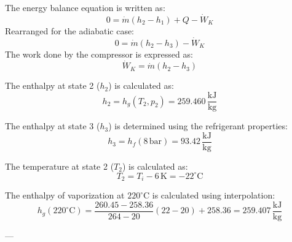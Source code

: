 The energy balance equation is written as:  
\[
0 = \dot{m}(h_2 - h_1) + Q - \dot{W}_K
\]  
Rearranged for the adiabatic case:  
\[
0 = \dot{m}(h_2 - h_3) - \dot{W}_K
\]  
The work done by the compressor is expressed as:  
\[
\dot{W}_K = \dot{m}(h_2 - h_3)
\]  

The enthalpy at state 2 (\(h_2\)) is calculated as:  
\[
h_2 = h_g(T_2, p_2) = 259.460 \, \frac{\text{kJ}}{\text{kg}}
\]  

The enthalpy at state 3 (\(h_3\)) is determined using the refrigerant properties:  
\[
h_3 = h_f(8 \, \text{bar}) = 93.42 \, \frac{\text{kJ}}{\text{kg}}
\]  

The temperature at state 2 (\(T_2\)) is calculated as:  
\[
T_2 = T_i - 6 \, \text{K} = -22^\circ\text{C}
\]  

The enthalpy of vaporization at \(220^\circ\text{C}\) is calculated using interpolation:  
\[
h_g(220^\circ\text{C}) = \frac{260.45 - 258.36}{264 - 20} (22 - 20) + 258.36 = 259.407 \, \frac{\text{kJ}}{\text{kg}}
\]  

---